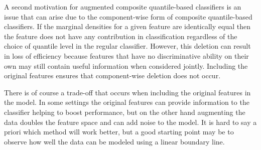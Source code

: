 A second motivation for augmented composite quantile-based classifiers is an
issue that can arise due to the component-wise form of composite quantile-based
classifiers.  If the marginal densities for a given feature are identically
equal then the feature does not have any contribution in classification
regardless of the choice of quantile level in the regular classifier.  However,
this deletion can result in loss of efficiency because features that have no
discriminative ability on their own may still contain useful information when
considered jointly.  Including the original features ensures that component-wise
deletion does not occur.

There is of course a trade-off that occurs when including the original features
in the model.  In some settings the original features can provide information to
the classifier helping to boost performance, but on the other hand augmenting
the data doubles the feature space and can add noise to the model.  It is hard
to say a priori which method will work better, but a good starting point may be
to observe how well the data can be modeled using a linear boundary line.




